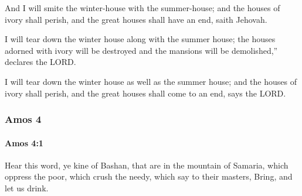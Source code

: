 			\begin{versebox}
					\item[BHS] 
					\item[LXX] 
					\item[ASV] And I will smite the winter-house with the summer-house; and the houses of ivory shall perish, and the great houses shall have an end, saith Jehovah.
					\item[NIV] I will tear down the winter house along with the summer house; the houses adorned with ivory will be destroyed and the mansions will be demolished,” declares the LORD.
					\item[NRSV] I will tear down the winter house as well as the summer house; and the houses of ivory shall perish, and the great houses shall come to an end, says the LORD.
			\end{versebox}
	\subsubsection{Amos 4} %
		\label{AMOS-4}

		\paragraph{Amos 4:1} %
			\label{AMOS-4-1}

			Hear this word, ye kine of Bashan, that are in the mountain of Samaria, which oppress the poor, which crush the needy, which say to their masters, Bring, and let us drink.

